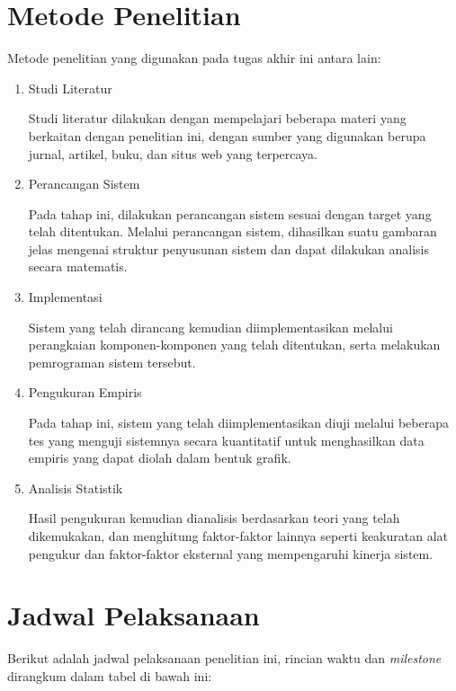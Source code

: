 \section{Metode Penelitian}
Metode penelitian yang digunakan pada tugas akhir ini antara lain:
\begin{enumerate}
	\item Studi Literatur
	
	Studi literatur dilakukan dengan mempelajari beberapa materi yang berkaitan dengan penelitian ini, dengan sumber yang digunakan berupa jurnal, artikel, buku, dan situs web yang terpercaya.
	\item Perancangan Sistem
	
	Pada tahap ini, dilakukan perancangan sistem sesuai dengan target yang telah ditentukan. Melalui perancangan sistem, dihasilkan suatu gambaran jelas mengenai struktur penyusunan sistem dan dapat dilakukan analisis secara matematis.
	\item Implementasi
	
	Sistem yang telah dirancang kemudian diimplementasikan melalui perangkaian komponen-komponen yang telah ditentukan, serta melakukan pemrograman sistem tersebut.
	\item Pengukuran Empiris
	
	Pada tahap ini, sistem yang telah diimplementasikan diuji melalui beberapa tes yang menguji sistemnya secara kuantitatif untuk menghasilkan data empiris yang dapat diolah dalam bentuk grafik.
	\item Analisis Statistik
	
	Hasil pengukuran kemudian dianalisis berdasarkan teori yang telah dikemukakan, dan menghitung faktor-faktor lainnya seperti keakuratan alat pengukur dan faktor-faktor eksternal yang mempengaruhi kinerja sistem.
\end{enumerate}

\section{Jadwal Pelaksanaan}
Berikut adalah jadwal pelaksanaan penelitian ini, rincian waktu dan \textit{milestone} dirangkum dalam tabel di bawah ini:

